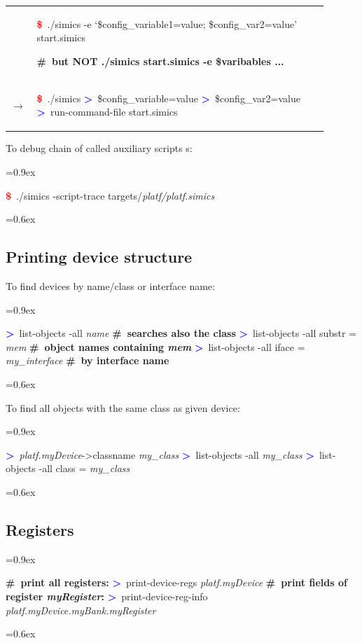\documentclass[8pt]{extarticle}
\newenvironment{code}[1][]{%
\begin{prebox}[#1]\obeylines%
\fontdimen2\font=0.9ex%
}{%
\end{prebox}%
\fontdimen2\font=0.6ex%
}
\newenvironment{codem}[2][\linewidth]{%
\begin{minipage}{#1}%
\begin{prebox}[colback=#2]\obeylines}{%
\end{prebox}%
\end{minipage}}
\newenvironment{code9}{%
\begin{codem}[0.9\linewidth]{green!15}}{\end{codem}}
\newcommand{\cod}[2][green!15]{\tcbox[
    size=fbox,
    on line,
    colback=#1,
    colframe=black,
    arc=0.3em  %
]{#2}}
\newcommand{\ind}{\hphantom{~~~}}
\newcommand{\prompt}{\textcolor{red}{\textbf{\$}\ }}
\newcommand{\sprompt}{\textcolor{blue}{\textbf{>}\ }}
\newcommand{\cmtcommon}[1]{\textcolor{Sepia}{\textbf{#1}}}
\newcommand{\cmt}[1]{\cmtcommon{\#\ #1}}
\newcommand{\p}[1]{\textit{\large#1}}
\begin{document}
\begin{multicols*}{3}
\begin{tabular}{p{0.05\linewidth}p{0.85\linewidth}}
        & \begin{code9}
            \prompt ./simics -e ‘\$config_variable1=value; \$config_var2=value’ start.simics

            \cmt{but NOT ./simics start.simics -e \$varibables ...}
        \end{code9}
        \vspace{0.05cm}
        \\
        $\longrightarrow$ &
        \begin{code9}
            \prompt ./simics
            \sprompt \$config_variable=value
            \sprompt \$config_var2=value
            \sprompt run-command-file start.simics
        \end{code9}
    \end{tabular}


    To debug chain of called auxiliary scripts \cod{include}s:
    \begin{code}
        \prompt ./simics -script-trace targets/\p{platf/platf.simics}
    \end{code}

\subsection{Printing device structure}
To find devices by name/class or interface name:
    \begin{code}
        \sprompt list-objects -all \p{name} \ind \cmt{searches also the class}
        \sprompt list-objects -all substr = \p{mem} \cmt{object names containing \p{mem}}
        \sprompt list-objects -all iface = \p{my_interface} \cmt{by interface name}
    \end{code}

To find all objects with the same class as given device:
        \begin{code}
            \sprompt \p{platf.myDevice}->classname
            \p{my_class}
            \sprompt list-objects -all \p{my_class}
            \sprompt list-objects -all class = \p{my_class}
        \end{code}

\subsection{Registers}
\begin{code}
    \cmt{print all registers:}
    \sprompt print-device-regs \p{platf.myDevice}
    \cmt{print fields of register \p{myRegister}:}
    \sprompt print-device-reg-info \p{platf.myDevice.myBank.myRegister}
\end{code}


\end{multicols*}
\end{document}
